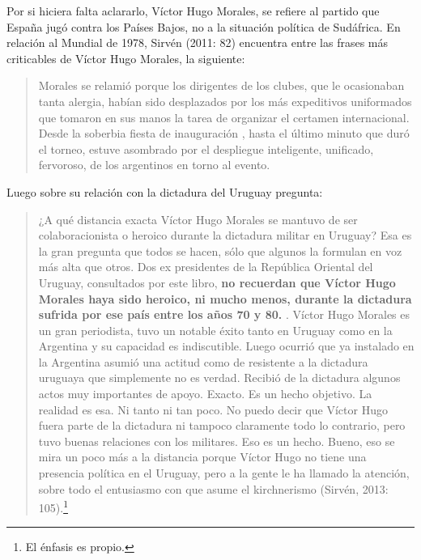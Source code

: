 Por si hiciera falta aclararlo, Víctor Hugo Morales, se refiere al partido que España jugó contra los Países Bajos, no a la situación política de Sudáfrica. En relación al Mundial de 1978, Sirvén (2011: 82) encuentra entre las frases más criticables de Víctor Hugo Morales, la siguiente:

\begin{quote}
Morales se relamió porque los dirigentes de los clubes, que le ocasionaban tanta alergia, habían sido desplazados por los más expeditivos uniformados que tomaron en sus manos la tarea de organizar el certamen internacional. Desde la soberbia fiesta de inauguración , hasta el último minuto que duró el torneo, estuve asombrado por el despliegue inteligente, unificado, fervoroso, de los argentinos en torno al evento.
\end{quote}

Luego sobre su relación con la dictadura del Uruguay pregunta:

\begin{quote}
¿A qué distancia exacta Víctor Hugo Morales se mantuvo de ser colaboracionista o heroico durante la dictadura militar en Uruguay? Esa es la gran pregunta que todos se hacen, sólo que algunos la formulan en voz más alta que otros. Dos ex presidentes de la República Oriental del Uruguay, consultados por este libro, \textbf{no recuerdan que Víctor Hugo Morales haya sido heroico, ni mucho menos, durante la dictadura sufrida por ese país entre los años 70 y 80.} . Víctor Hugo Morales es un gran periodista, tuvo un notable éxito tanto en Uruguay como en la Argentina y su capacidad es indiscutible. Luego ocurrió que ya instalado en la Argentina asumió una actitud como de resistente a la dictadura uruguaya que simplemente no es verdad. Recibió de la dictadura algunos actos muy importantes de apoyo.  Exacto. Es un hecho objetivo. La realidad es esa. Ni tanto ni tan poco. No puedo decir que Víctor Hugo fuera parte de la dictadura ni tampoco claramente todo lo contrario, pero tuvo buenas relaciones con los militares. Eso es un hecho.  Bueno, eso se mira un poco más a la distancia porque Víctor Hugo no tiene una presencia política en el Uruguay, pero a la gente le ha llamado la atención, sobre todo el entusiasmo con que asume el kirchnerismo (Sirvén, 2013: 105).\footnote{El énfasis es propio.}
\end{quote}

